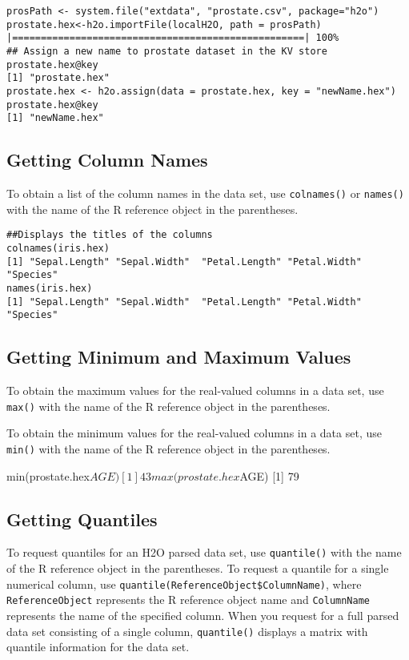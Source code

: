\begin{lstlisting}[style=R]
prosPath <- system.file("extdata", "prostate.csv", package="h2o")
prostate.hex<-h2o.importFile(localH2O, path = prosPath)
|===================================================| 100%
## Assign a new name to prostate dataset in the KV store
prostate.hex@key
[1] "prostate.hex"
prostate.hex <- h2o.assign(data = prostate.hex, key = "newName.hex")
prostate.hex@key
[1] "newName.hex"

\end{lstlisting}

\subsection{Getting Column Names}

To obtain a list of the column names in the data set, use {\texttt{colnames()}} or {\texttt{names()}} with the name of the R reference object in the parentheses. 

\begin{lstlisting}[style=R]
##Displays the titles of the columns
colnames(iris.hex)
[1] "Sepal.Length" "Sepal.Width"  "Petal.Length" "Petal.Width"  "Species"     
names(iris.hex)
[1] "Sepal.Length" "Sepal.Width"  "Petal.Length" "Petal.Width"  "Species"     
\end{lstlisting}


\subsection{Getting Minimum and Maximum Values}

To obtain the maximum values for the real-valued columns in a data set, use {\texttt{max()}} with the name of the R reference object in the parentheses. 

To obtain the minimum values for the real-valued columns in a data set, use {\texttt{min()}} with the name of the R reference object in the parentheses. 
\begin{spverbatim}
min(prostate.hex$AGE)
[1] 43
max(prostate.hex$AGE)
[1] 79
\end{spverbatim}


\subsection{Getting Quantiles}

To request quantiles for an H2O parsed data set, use {\texttt{quantile()}} with the name of the R reference object in the parentheses. 
To request a quantile for a single numerical column, use {\texttt{quantile(ReferenceObject\$ColumnName)}},  where {\texttt{ReferenceObject}} represents the R reference object name and {\texttt{ColumnName}} represents the name of the specified column. 
When you request for a full parsed data set consisting of a single column, {\texttt{quantile()}} displays a matrix with quantile information for the data set. 

